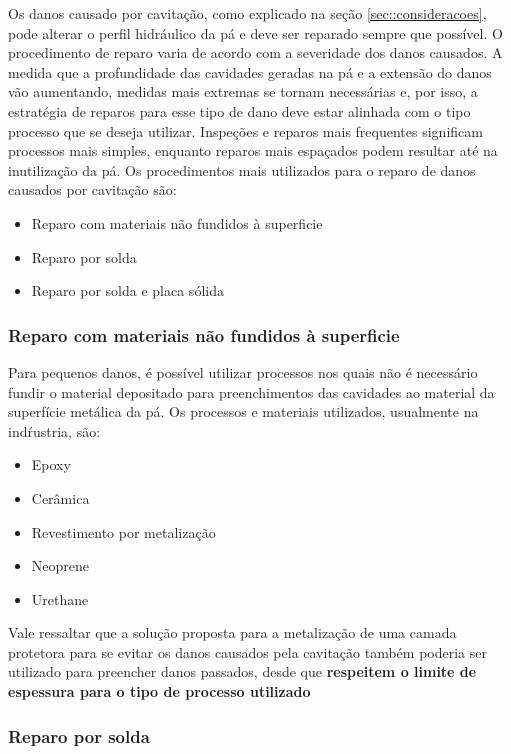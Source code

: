 Os danos causado por cavitação, como explicado na seção
\ref{sec::consideracoes}, pode alterar o perfil hidráulico da pá e deve ser
reparado sempre que possível. O procedimento de reparo varia de acordo com a
severidade dos danos causados. A medida que a profundidade das cavidades geradas
na pá e a extensão do danos vão aumentando, medidas mais extremas se tornam
necessárias e, por isso, a estratégia de reparos para esse tipo de dano deve
estar alinhada com o tipo processo que se deseja utilizar. Inspeções e reparos
mais frequentes significam processos mais simples, enquanto reparos mais
espaçados podem resultar até na inutilização da pá. Os procedimentos mais
utilizados para o reparo de danos causados por cavitação são:

\begin{itemize}
  \item Reparo com materiais não fundidos à superficie
  \item Reparo por solda
  \item Reparo por solda e placa sólida
\end{itemize}

\subsubsection{Reparo com materiais não fundidos à superficie}

Para pequenos danos, é possível utilizar processos nos quais não é necessário
fundir o material depositado para preenchimentos das cavidades ao material da
superfície metálica da pá. Os processos e materiais utilizados, usualmente na
indŕustria, são: 

\begin{itemize}
\item Epoxy
\item Cerâmica
\item Revestimento por metalização
\item Neoprene
\item Urethane
\end{itemize}

Vale ressaltar que a solução proposta para a metalização de uma camada protetora
para se evitar os danos causados pela cavitação também poderia ser utilizado
para preencher danos passados, desde que \textbf{respeitem o limite de espessura
para o tipo de processo utilizado}


\subsubsection{Reparo por solda}


